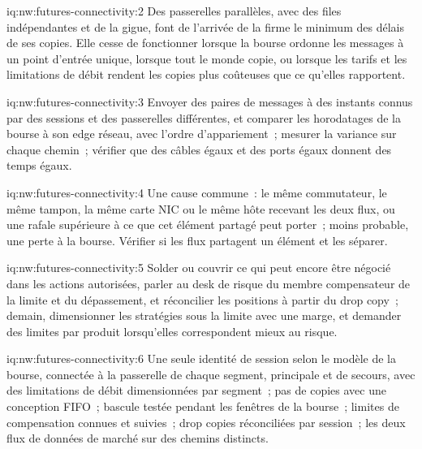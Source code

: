 \begin{solution}{iq:nw:futures-connectivity:2}
Des passerelles parallèles, avec des files indépendantes et de la gigue, font de l'arrivée de la firme le minimum des délais de ses copies. Elle cesse de fonctionner
lorsque la bourse ordonne les messages à un point d'entrée unique, lorsque tout le monde copie, ou lorsque les tarifs et les limitations de débit rendent les copies plus coûteuses que
ce qu'elles rapportent.
\end{solution}

\begin{solution}{iq:nw:futures-connectivity:3}
Envoyer des paires de messages à des instants connus par des sessions et des passerelles différentes, et comparer les horodatages de la bourse à son edge
réseau, avec l'ordre d'appariement~; mesurer la variance sur chaque chemin~; vérifier que des câbles égaux et des ports égaux donnent des temps égaux.
\end{solution}

\begin{solution}{iq:nw:futures-connectivity:4}
Une cause commune~: le même commutateur, le même tampon, la même carte NIC ou le même hôte recevant les deux flux, ou une rafale supérieure à ce que cet élément partagé peut porter~; moins
probable, une perte à la bourse. Vérifier si les flux partagent un élément et les séparer.
\end{solution}

\begin{solution}{iq:nw:futures-connectivity:5}
Solder ou couvrir ce qui peut encore être négocié dans les actions autorisées, parler au desk de risque du membre compensateur de la limite et
du dépassement, et réconcilier les positions à partir du drop copy~; demain, dimensionner les stratégies sous la limite avec une marge, et demander des limites
par produit lorsqu'elles correspondent mieux au risque.
\end{solution}

\begin{solution}{iq:nw:futures-connectivity:6}
Une seule identité de session selon le modèle de la bourse, connectée à la passerelle de chaque segment, principale et de secours, avec des limitations de débit dimensionnées par
segment~; pas de copies avec une conception FIFO~; bascule testée pendant les fenêtres de la bourse~; limites de compensation connues et suivies~; drop copies
réconciliées par session~; les deux flux de données de marché sur des chemins distincts.
\end{solution}
